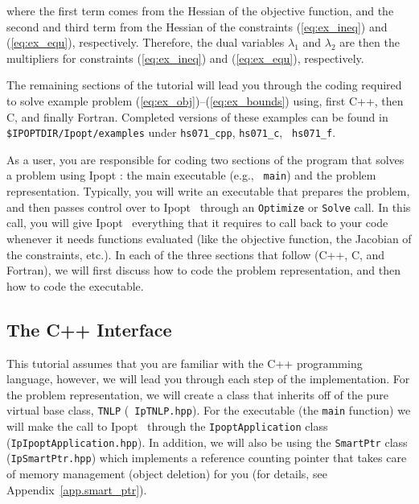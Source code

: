 \documentclass[10pt]{article}
\newcommand{\Ipopt}{{\sc Ipopt }}
\begin{document}
where the first term comes from the Hessian of the objective function,
and the second and third term from the Hessian of the constraints
(\ref{eq:ex_ineq}) and (\ref{eq:ex_equ}), respectively. Therefore, the
dual variables $\lambda_1$ and $\lambda_2$ are then the multipliers
for constraints (\ref{eq:ex_ineq}) and (\ref{eq:ex_equ}), respectively.

\vspace{\baselineskip}

The remaining sections of the tutorial will lead you through
the coding required to solve example problem
(\ref{eq:ex_obj})--(\ref{eq:ex_bounds}) using, first C++, then C, and finally
Fortran. Completed versions of these examples can be found in {\tt
\$IPOPTDIR/Ipopt/examples} under {\tt hs071\_cpp}, {\tt hs071\_c}, {\tt
hs071\_f}.

As a user, you are responsible for coding two sections of the program
that solves a problem using \Ipopt: the main executable (e.g., {\tt
  main}) and the problem representation.  Typically, you will write an
executable that prepares the problem, and then passes control over to
\Ipopt\ through an {\tt Optimize} or {\tt Solve} call. In this call,
you will give \Ipopt\ everything that it requires to call back to your
code whenever it needs functions evaluated (like the objective
function, the Jacobian of the constraints, etc.).  In each of the
three sections that follow (C++, C, and Fortran), we will first
discuss how to code the problem representation, and then how to code
the executable.

\subsection{The C++ Interface}
This tutorial assumes that you are familiar with the C++ programming
language, however, we will lead you through each step of the
implementation. For the problem representation, we will create a class
that inherits off of the pure virtual base class, {\tt TNLP} ({\tt
  IpTNLP.hpp}). For the executable (the {\tt main} function) we will
make the call to \Ipopt\ through the {\tt IpoptApplication} class
({\tt IpIpoptApplication.hpp}). In addition, we will also be using the
{\tt SmartPtr} class ({\tt IpSmartPtr.hpp}) which implements a reference
counting pointer that takes care of memory management (object
deletion) for you (for details, see Appendix~\ref{app.smart_ptr}).
\end{document}
